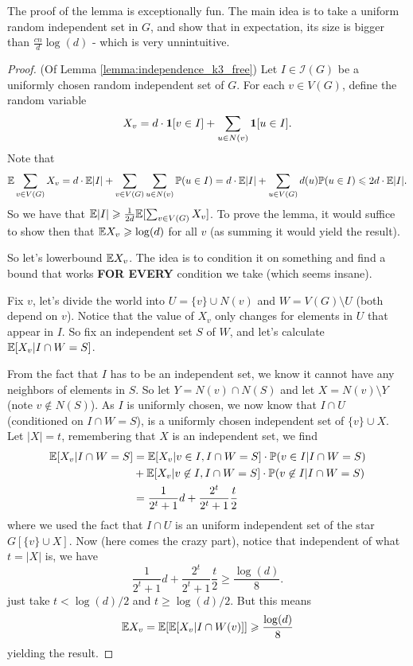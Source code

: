 The proof of the lemma is exceptionally fun. The main idea is to take
a uniform random independent set in $G$,
and show that in expectation, its size is bigger than
$\frac{cn}{d}\log(d)$ - which is very unnintuitive.
\begin{proof}
	(Of Lemma \ref{lemma:independence_k3_free}) Let $I \in
	\mathcal{I}(G)$ be a uniformly chosen random independent set of $G$.
	For each $v \in V(G)$, define the random variable
	\[
		X_v = d \cdot \bm{1}[v \in I] + \sum_{u \in N(v)} \bm{1}[u \in I].
	\]
	Note that
	\[
		\mathbb{E} \sum_{v \in V(G)} X_v = d\cdot \mathbb{E} |I| + \sum_{v \in V(G)}
		\sum_{u \in N(v)} \mathbb{P}(u \in I) =
		d\cdot \mathbb{E} |I| + \sum_{u \in V(G)} d(u) \mathbb{P}(u \in I) \leqslant 2d\cdot \mathbb{E} |I|.
	\]
	So we have that $\mathbb{E} |I| \geqslant \frac{1}{2d} \mathbb{E} [\sum_{v \in V(G)}
	X_v]$. To prove the lemma,
	it would suffice to show then that $\mathbb{E} X_v \geqslant \log(d)$ for all
	$v$ (as summing it would yield the result).

	So let's lowerbound $\mathbb{E} X_v$. The idea is to condition it on
	something and find a bound that works \textbf{FOR EVERY} condition
	we take (which seems insane).

	Fix $v$, let's divide the world into $U = \{v\} \cup N(v)$ and $W =
	V(G)\setminus U$ (both depend on $v$). Notice
	that the value of $X_v$ only changes for elements in $U$ that
	appear in $I$. So fix an independent set $S$ of $W$, and let's
	calculate $\mathbb{E}[X_v | I \cap W = S]$.

	From the fact that $I$ has to be an independent set, we know it
	cannot have any neighbors
	of elements in $S$. So let $Y = N(v) \cap N(S)$ and let
	$X = N(v) \setminus Y$ (note $v \not \in N(S)$). As $I$ is
	uniformly chosen, we now know that $I \cap U$ (conditioned on $I \cap W = S$),
	is a uniformly chosen independent set of $\{v\} \cup X$. Let $|X| =
	t$, remembering that $X$ is an independent set, we find
	\begin{align*}
		\mathbb{E}[X_v | I \cap W = S] &= \mathbb{E}[X_v | v \in I, I \cap W =
		S]\cdot\mathbb{P}(v\in I | I \cap W = S)\\
		&+ \mathbb{E}[X_v | v \not \in I, I \cap W = S]\cdot\mathbb{P}(v \not \in I | I
		\cap W = S)\\
		&= \frac{1}{2^t + 1}d + \frac{2^t}{2^t + 1} \frac{t}{2}
	\end{align*}
	where we used the fact that $I \cap U$ is an uniform independent
	set of the star $G[\{v\} \cup X]$. Now (here comes the crazy part),
	notice that independent of what $t = |X|$ is, we have
	\[
		\frac{1}{2^t + 1}d + \frac{2^t}{2^t + 1} \frac{t}{2} \geq \frac{\log(d)}{8}.
	\]
	just take $t < \log(d)/2$ and $t \geq \log(d)/2$. But this means
	\[
		\mathbb{E} X_v = \mathbb{E}[\mathbb{E}[X_v| I \cap W(v)]] \geqslant \frac{\log(d)}{8}
	\]
	yielding the result.
\end{proof}

